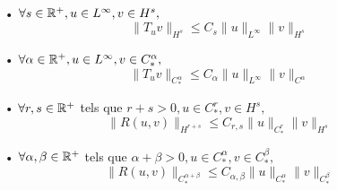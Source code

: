 \documentclass[11pt,a4paper]{article}
\begin{document}
\begin{prop}\label{tame} ~\\
\begin{itemize}
\item[•] $\forall s\in \mathbb R^+, u \in L^\infty, v\in H^s,$
\begin{equation}\label{estim1}
\|T_uv\|_{H^s} \leq C_s \|u\|_{L^\infty} \|v\|_{H^s}
\end{equation}
\item[•] $\forall \alpha \in \mathbb R^+, u \in L^\infty, v\in C^\alpha_*,$
\begin{equation}\label{estim2}
\|T_uv\|_{C^\alpha_*} \leq C_\alpha \|u\|_{L^\infty} \|v\|_{C^\alpha}
\end{equation}
\item[•] $\forall r,s\in \mathbb R^+$ tels que $r+s>0, u \in C^r_*, v\in H^s,$
\begin{equation}\label{estim3}
\|R(u,v)\|_{H^{r+s}} \leq C_{r,s} \|u\|_{C^r_*} \|v\|_{H^s}
\end{equation}
\item[•] $\forall \alpha,\beta\in \mathbb R^+$ tels que $\alpha + \beta>0, u \in C^\alpha_*, v\in C^\beta_*,$
\begin{equation}\label{estim4}
\|R(u,v)\|_{C^{\alpha + \beta}_*} \leq C_{\alpha,\beta} \|u\|_{C^\alpha_*} \|v\|_{C^\beta_*}
\end{equation}
\end{itemize}
\end{prop}
\end{document}
